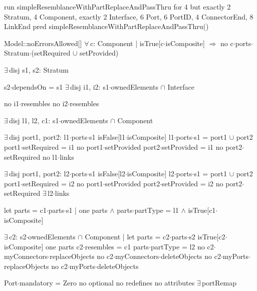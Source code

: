 run simpleResemblanceWithPartReplaceAndPassThru for 4 but exactly 2 Stratum, 4 Component, exactly 2 Interface, 6 Port, 6 PortID, 4 ConnectorEnd, 8 LinkEnd
pred simpleResemblanceWithPartReplaceAndPassThru()
{
  Model::noErrorsAllowed[]
  $\forall\,$c: Component |
    isTrue[c$\cdot$isComposite] $\Longrightarrow$
      no c$\cdot$ports$\cdot$Stratum$\cdot$(setRequired $\cup$ setProvided)
  
  $\exists\,$disj s1, s2: Stratum
  {
    s2$\cdot$dependsOn = s1
    $\exists\,$disj i1, i2: s1$\cdot$ownedElements $\cap$ Interface
    {
      no i1$\cdot$resembles
      no i2$\cdot$resembles
      
      $\exists\,$disj l1, l2, c1: s1$\cdot$ownedElements $\cap$ Component
      {
        $\exists\,$disj port1, port2: l1$\cdot$ports$\cdot$s1
        {
          isFalse[l1$\cdot$isComposite]
          l1$\cdot$ports$\cdot$s1 = port1 $\cup$ port2
          port1$\cdot$setRequired = i1
          no port1$\cdot$setProvided
          port2$\cdot$setProvided = i1
          no port2$\cdot$setRequired
          no l1$\cdot$links
        }

        $\exists\,$disj port1, port2: l2$\cdot$ports$\cdot$s1
        {
          isFalse[l2$\cdot$isComposite]
          l2$\cdot$ports$\cdot$s1 = port1 $\cup$ port2
          port1$\cdot$setRequired = i2
          no port1$\cdot$setProvided
          port2$\cdot$setProvided = i2
          no port2$\cdot$setRequired
          $\exists\,$l2$\cdot$links
        }
        
        let parts = c1$\cdot$parts$\cdot$s1 |
          one parts $\wedge$ parts$\cdot$partType = l1 $\wedge$ isTrue[c1$\cdot$isComposite]

        $\exists\,$c2: s2$\cdot$ownedElements $\cap$ Component | let parts = c2$\cdot$parts$\cdot$s2
        {
          isTrue[c2$\cdot$isComposite]
          one parts
          c2$\cdot$resembles = c1
          parts$\cdot$partType = l2
          no c2$\cdot$myConnectors$\cdot$replaceObjects
          no c2$\cdot$myConnectors$\cdot$deleteObjects
          no c2$\cdot$myPorts$\cdot$replaceObjects
          no c2$\cdot$myPorts$\cdot$deleteObjects
        }
      }      
    }
  }
  Port$\cdot$mandatory = Zero
  no optional
  no redefines
  no attributes
  $\exists\,$portRemap
}


